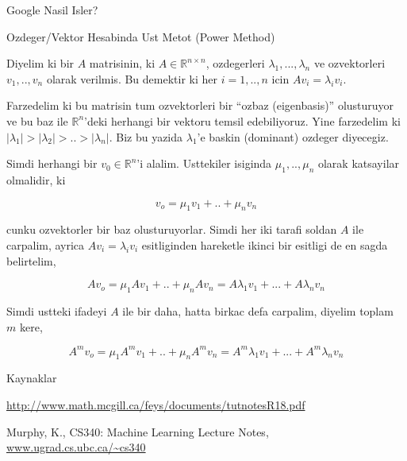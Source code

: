 \documentclass[12pt,fleqn]{article}\usepackage{../common}
\begin{document}
Google Nasil Isler? 

Ozdeger/Vektor Hesabinda Ust Metot (Power Method)

Diyelim ki bir $A$ matrisinin, ki $A \in \mathbb{R}^{n \times n}$,
ozdegerleri $\lambda_1,...,\lambda_n$ ve ozvektorleri $v_1,..,v_n$ olarak
verilmis. Bu demektir ki her $i=1,..,n$ icin $Av_i = \lambda_i v_i$.

Farzedelim ki bu matrisin tum ozvektorleri bir ``ozbaz (eigenbasis)''
olusturuyor ve bu baz ile $\mathbb{R}^n$'deki herhangi bir vektoru temsil
edebiliyoruz. Yine farzedelim ki $|\lambda_1| > |\lambda_2| > .. >
|\lambda_n| $. Biz bu yazida $\lambda_1$'e 
baskin (dominant) ozdeger diyecegiz.

Simdi herhangi bir $v_0 \in \mathbb{R}^n$'i alalim. Usttekiler isiginda
$\mu_1,..,\mu_n$ olarak katsayilar olmalidir, ki 

$$ v_o = \mu_1v_1 + .. + \mu_nv_n 
$$

cunku ozvektorler bir baz olusturuyorlar. Simdi her iki tarafi soldan $A$
ile carpalim, ayrica $Av_i = \lambda_iv_i$ esitliginden hareketle ikinci
bir esitligi de en sagda belirtelim,

$$ A v_o = \mu_1 A v_1 + .. + \mu_n A v_n =
A \lambda_1v_1 + ... + A \lambda_nv_n
$$

Simdi ustteki ifadeyi $A$ ile bir daha, hatta birkac defa carpalim, diyelim
toplam $m$ kere,

$$ A^m v_o = \mu_1 A^m v_1 + .. + \mu_n A^m v_n =
A^m \lambda_1v_1 + ... + A^m \lambda_nv_n
$$













Kaynaklar

\url{http://www.math.mcgill.ca/feys/documents/tutnotesR18.pdf}

Murphy, K., CS340: Machine Learning Lecture Notes, \url{www.ugrad.cs.ubc.ca/~cs340}
\end{document}
